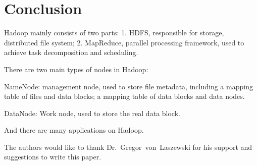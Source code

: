 \section{Conclusion}
Hadoop mainly consists of two parts: 1. HDFS, responsible for storage, distributed 
file system; 2. MapReduce, parallel processing framework, used to achieve task 
decomposition and scheduling. 

There are two main types of nodes in Hadoop:

NameNode: management node, used to store file metadata, including a mapping table 
of files and data blocks; a mapping table of data blocks and data nodes.

DataNode: Work node, used to store the real data block.

And there are many applications on Hadoop.

\begin{acks}

  The authors would like to thank Dr.~Gregor~von~Laszewski for his
  support and suggestions to write this paper.

\end{acks}


 

